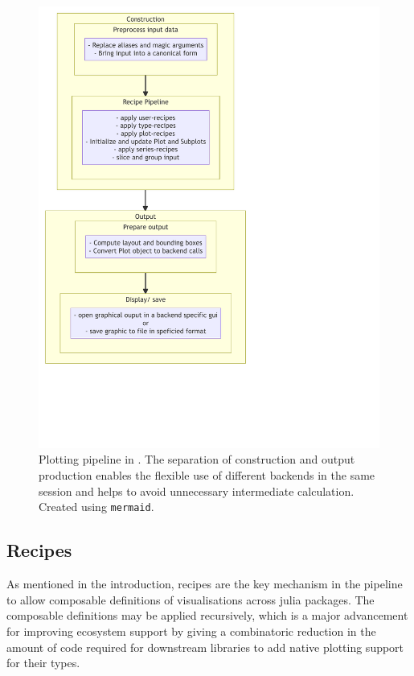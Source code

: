 \begin{figure}[H]
    \centering
    \includegraphics[width=\textwidth]{./fig/Pipeline.pdf}
    \caption{
        Plotting pipeline in \Plots{}.
        The separation of construction and output production enables the flexible use of different backends in the same session and helps to avoid unnecessary intermediate calculation.
        Created using \texttt{mermaid}\cite{Mermaid}.
    }
    \label{fig:pipeline}
\end{figure}

\subsection*{Recipes}
\label{sec:recipes}

As mentioned in the introduction, recipes are the key mechanism in the \Plots \linebreak pipeline to allow composable definitions of visualisations across julia packages.
The composable definitions may be applied recursively, which is a major advancement for improving ecosystem support by giving a combinatoric reduction in the amount of code required for downstream libraries to add native plotting support for their types.

